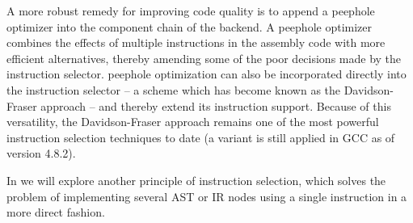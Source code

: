 A more robust remedy for improving code quality is to append a \gls{peephole
  optimizer} into the component chain of the \gls{backend}.
%
A \gls{peephole optimizer} combines the effects of multiple \glspl{instruction}
in the \gls{assembly code} with more efficient alternatives, thereby amending
some of the poor decisions made by the \gls{instruction selector}.
%
\Gls{peephole optimization} can also be incorporated directly into the
\gls{instruction selector} -- a scheme which has become known as the
\gls{Davidson-Fraser approach} -- and thereby extend its \gls{instruction}
support.
%
Because of this versatility, the \gls{Davidson-Fraser approach} remains one of
the most powerful \gls{instruction selection} techniques to date (a variant is
still applied in \gls{GCC} as of version 4.8.2).

In  we will explore another \gls{principle} of
\gls{instruction selection}, which solves the problem of implementing several
\gls{AST} or \gls{IR} \glspl{node} using a single \gls{instruction} in a more
direct fashion.

